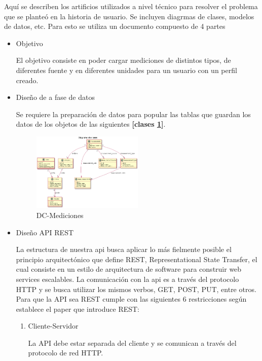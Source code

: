 \documentclass[a4paper,12pt]{article}
\begin{document}
Aquí se describen los artificios utilizados a nivel técnico para resolver el problema que se planteó en la historia de usuario. Se incluyen diagrmas de clases, modelos de datos, etc. Para esto se utiliza un documento compuesto de 4 partes
\begin{itemize}
\item Objetivo

El objetivo consiste en poder cargar mediciones de distintos tipos, de diferentes fuente y en diferentes unidades para un usuario con un perfil creado.

\item Diseño de a fase de datos

Se requiere la preparación de datos para popular las tablas que guardan los datos de los objetos de las siguientes \textbf{[clases \ref{2-caso_de_uso}]}.

    \begin{figure}[h]
        \centering
        \includegraphics[width=0.5\textwidth]{img/dc_mediciones}
        \caption{DC-Mediciones}
		\label{2-caso_de_uso}
    \end{figure}

\item Diseño API REST


La estructura de nuestra api busca aplicar lo más fielmente posible el principio arquitectónico que define  REST, Representational State Transfer, el cual consiste en un estilo de arquitectura de software para construir web services escalables. La comunicación con la api es a través del protocolo HTTP y se busca utilizar los mismos verbos, GET, POST, PUT, entre otros. Para que la API sea REST cumple con las siguientes 6 restricciones según establece el paper que introduce REST:
\begin{enumerate}
	\item Cliente-Servidor
    
    La API debe estar separada del cliente y se comunican a través del protocolo de red HTTP.
    

\end{enumerate}
\end{itemize}
\end{document}
